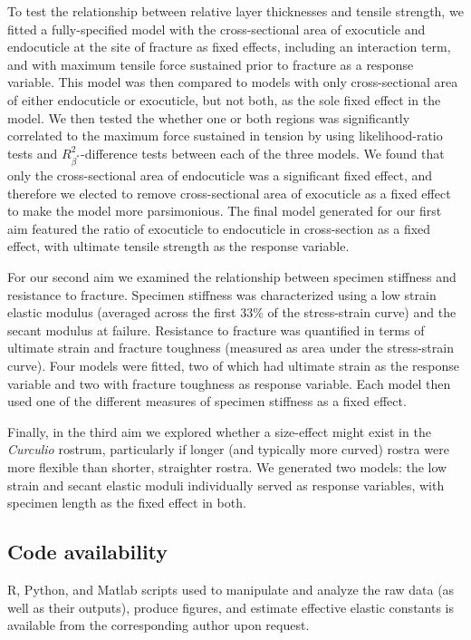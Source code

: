\documentclass[twocolumn, linenumbers, superscriptaddress, nofootinbib]{revtex4-1}
\begin{document}
				To test the relationship between relative layer thicknesses and tensile strength, we fitted a fully-specified model with the cross-sectional area of exocuticle and endocuticle at the site of fracture as fixed effects, including an interaction term, and with maximum tensile force sustained prior to fracture as a response variable.
				This model was then compared to models with only cross-sectional area of either endocuticle or exocuticle, but not both, as the sole fixed effect in the model.
				We then tested the whether one or both regions was significantly correlated to the maximum force sustained in tension by using likelihood-ratio tests and $R^{2}_{\beta^*}$-difference tests between each of the three models.
				We found that only the cross-sectional area of endocuticle was a significant fixed effect, and therefore we elected to remove cross-sectional area of exocuticle as a fixed effect to make the model more parsimonious.
				The final model generated for our first aim featured the ratio of exocuticle to endocuticle in cross-section as a fixed effect, with ultimate tensile strength as the response variable.
				
				For our second aim we examined the relationship between specimen stiffness and resistance to fracture.
				Specimen stiffness was characterized using a low strain elastic modulus (averaged across the first 33\% of the stress-strain curve) and the secant modulus at failure.
				Resistance to fracture was quantified in terms of ultimate strain and fracture toughness (measured as area under the stress-strain curve).
				Four models were fitted, two of which had ultimate strain as the response variable and two with fracture toughness as response variable.
				Each model then used one of the different measures of specimen stiffness as a fixed effect.
				
				Finally, in the third aim we explored whether a size-effect might exist in the \textit{Curculio} rostrum, particularly if longer (and typically more curved) rostra were more flexible than shorter, straighter rostra.
				We generated two models: the low strain and secant elastic moduli individually served as response variables, with specimen length as the fixed effect in both.

		\subsection*{Code availability}
			R, Python, and Matlab scripts used to manipulate and analyze the raw data (as well as their outputs), produce figures, and estimate effective elastic constants is available from the corresponding author upon request.
			
\end{document}
